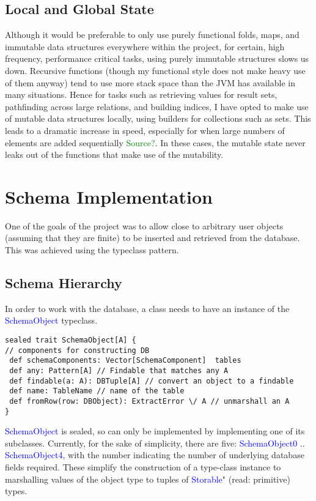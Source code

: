 \documentclass[12pt,a4paper,twoside,openright]{report}
\newcommand\codeName[1]{\textcolor{blue}{#1}}
\newcommand\toReference[1]{\textcolor{green}{#1}}
\begin{document}
{{	
	\subsection{Local and Global State}
Although it would be preferable to only use purely functional folds, maps, and immutable data structures everywhere within the project, for certain, high frequency, performance critical tasks, using purely immutable structures slows us down. Recursive functions (though my functional style does not make heavy use of them anyway) tend to use more stack space than the JVM has available in many situations. Hence for tasks such as retrieving values for result sets,  pathfinding across large relations, and building indices, I have opted to make use of mutable data structures locally, using builders for collections such as sets. This leads to a dramatic increase in speed, especially for when large numbers of elements are added sequentially \toReference{Source?}. In these cases, the mutable state never leaks out of the functions that make use of the mutability.	
	
\section{Schema Implementation}
	One of the goals of the project was to allow close to arbitrary user objects (assuming that they are finite) to be inserted and retrieved from the database. This was achieved using the typeclass pattern.
	\subsection{Schema Hierarchy}
	In order to work with the database, a class needs to have an instance of the \codeName{SchemaObject} typeclass.
	\begin{framed}
		\begin{verbatim}
sealed trait SchemaObject[A] {
// components for constructing DB
 def schemaComponents: Vector[SchemaComponent]  tables
 def any: Pattern[A] // Findable that matches any A
 def findable(a: A): DBTuple[A] // convert an object to a findable
 def name: TableName // name of the table
 def fromRow(row: DBObject): ExtractError \/ A // unmarshall an A
}

		\end{verbatim}
		
	\end{framed}
	
	\codeName{SchemaObject} is sealed, so can only be implemented by implementing one of its subclasses. Currently, for the sake of simplicity, there are five: \codeName{SchemaObject0} .. \codeName{SchemaObject4}, with the number indicating the number of underlying database fields required. These simplify the construction of a type-class instance to marshalling values of the object type to tuples of  \codeName{Storable}"  (read: primitive) types.
	
}}
\end{document}
